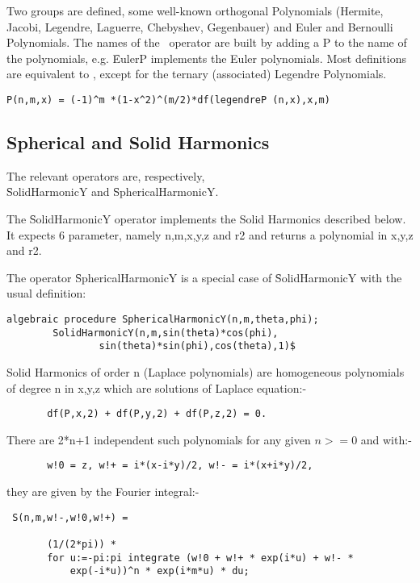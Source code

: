 Two groups are defined, some well-known orthogonal Polynomials
(Hermite, Jacobi, Legendre, Laguerre, Chebyshev, Gegenbauer)
and Euler and Bernoulli Polynomials.
The names of the \REDUCE\  operator are built by adding a P
to the name
of the polynomials, e.g. \f{EulerP} implements the Euler polynomials.
Most definitions are equivalent to \cite{AbramowitzStegun:72}, except
for the ternary (associated) Legendre Polynomials.

\begin{verbatim}
P(n,m,x) = (-1)^m *(1-x^2)^(m/2)*df(legendreP (n,x),x,m)
\end{verbatim}

\subsection{Spherical and Solid Harmonics}
 
 
The relevant operators are, respectively,\\
\f{SolidHarmonicY} and \f{SphericalHarmonicY}.

The \f{SolidHarmonicY} operator implements the Solid Harmonics
described below. It expects 6 parameter, namely n,m,x,y,z and r2
and returns a polynomial in x,y,z and r2.

The operator
\f{SphericalHarmonicY} is a special case of \f{SolidHarmonicY}
with the usual definition:

\begin{verbatim}
algebraic procedure SphericalHarmonicY(n,m,theta,phi);
        SolidHarmonicY(n,m,sin(theta)*cos(phi),
                sin(theta)*sin(phi),cos(theta),1)$
\end{verbatim}


Solid Harmonics of order n (Laplace polynomials)
are homogeneous polynomials of degree n in x,y,z
which are solutions of Laplace equation:-

\begin{verbatim}
       df(P,x,2) + df(P,y,2) + df(P,z,2) = 0.
\end{verbatim}

There are 2*n+1 independent such polynomials for any given $n >=0$
and with:-

\begin{verbatim}
       w!0 = z, w!+ = i*(x-i*y)/2, w!- = i*(x+i*y)/2,
\end{verbatim}

they are given by the Fourier integral:-

\begin{verbatim}
 S(n,m,w!-,w!0,w!+) =

       (1/(2*pi)) *
       for u:=-pi:pi integrate (w!0 + w!+ * exp(i*u) + w!- *
           exp(-i*u))^n * exp(i*m*u) * du;
\end{verbatim}

